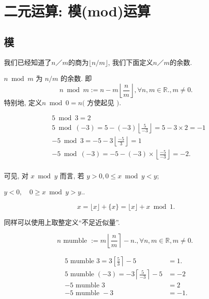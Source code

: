 \documentclass{ctexart}
\begin{document}
\newpage

\label{sec:mod}
\section{二元运算: 模(mod)运算}

\subsection{模} 我们已经知道了$n／m$的商为$\lfloor n / m\rfloor$, 我们下面定义$n／m$的余数. 

\begin{definition}
$n \bmod m$ 为 $n / m$ 的余数. 即     
$$
n \bmod m:=n-m\left\lfloor\frac{n}{m}\right\rfloor, \forall n, m \in \mathbb{R} ., m \neq 0 .
$$
特别地, 定义$n \bmod 0=n($ 方使起见 $)$. 

\end{definition}

\begin{example}
    $$
\begin{aligned}
& 5 \bmod 3=2 \\
& 5 \bmod (-3)=5-(-3)\left\lfloor\frac{5}{-3}\right\rfloor=5-3 \times 2=-1 \\
& -5 \bmod 3=-5-3\left\lfloor\frac{-5}{3}\right\rfloor=1 \\
& -5 \bmod (-3)=-5-(-3) \times\left\lfloor\frac{-5}{-3}\right\rfloor=-2 . \\
&
\end{aligned}
$$

可见, 对 $x \bmod y$ 而言, 若 $y>0 ,  0 \leqslant x \bmod y<y$; 

$y<0, \quad 0 \geqslant x \bmod y>y .$. 
\end{example}

\begin{example}
    $$
x=\lfloor x\rfloor+\{x\}=\lfloor x\rfloor+x \bmod 1 .
$$
    
\end{example}

同样可以使用上取整定义``不足近似量''.

\begin{definition}
    $$
n \text { mumble }:=m\left\lfloor\frac{n}{m}\right\rceil-n ., \forall n, m \in \mathbb{R}, m \neq 0 \text {. }
$$
    
\end{definition}


\begin{example}
    $$
\begin{aligned}
5 \text { mumble } 3=3\left[\frac{5}{3}\right\rceil-5 & =1 . \\
5 \text { mumble }(-3)=-3\left\lceil\frac{5}{-3}\right\rceil-5 & =-2 \\
-5 \text { mumble } 3 & =2 \\
-5 \text { mumble }-3 \quad & =-1 .
\end{aligned}
$$
    
\end{example}
\end{document}
